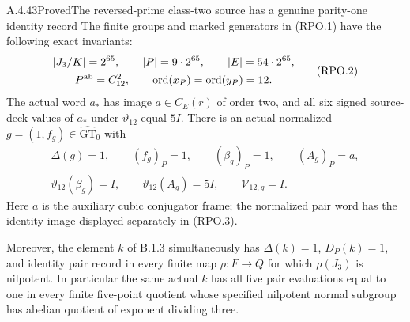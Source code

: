 \begin{result}{A.4.43}{Proved}{The reversed-prime class-two source has a genuine parity-one identity record}
The finite groups and marked generators in (RPO.1)
have the following exact invariants:
\[
 \begin{gathered}
 |J_3/K|=2^{65},\qquad |P|=9\cdot2^{65},\qquad
 |E|=54\cdot2^{65},\\
 P^{\rm ab}=C_{12}^2,
 \qquad\operatorname{ord}(x_P)=\operatorname{ord}(y_P)=12.
 \end{gathered}                                                   \tag{RPO.2}
\]
The actual word $a_*$ has image $a\in C_E(r)$ of
order two, and all six signed source-deck values
of $a_*$ under $\vartheta_{12}$ equal $5I$.
There is an actual normalized
$g=(1,f_g)\in\widehat{\mathrm{GT}}_0$ with
\[
 \begin{gathered}
 \Delta(g)=1,\qquad (f_g)_P=1,\qquad
 (\beta_g)_P=1,\qquad (A_g)_P=a,\\
 \vartheta_{12}(\beta_g)=I,\qquad
 \vartheta_{12}(A_g)=5I,\qquad\mathcal V_{12,g}=I.
 \end{gathered}                                                   \tag{RPO.3}
\]
Here $a$ is the auxiliary cubic conjugator frame;
the normalized pair word has the identity image
displayed separately in (RPO.3).

Moreover, the element $k$ of B.1.3 simultaneously
has $\Delta(k)=1$, $D_P(k)=1$, and identity pair
record in every finite map $\rho:F\to Q$ for which
$\rho(J_3)$ is nilpotent.
In particular the same actual $k$ has all five
pair evaluations equal to one in every finite
five-point quotient whose specified nilpotent
normal subgroup has abelian quotient of exponent
dividing three.
\end{result}
